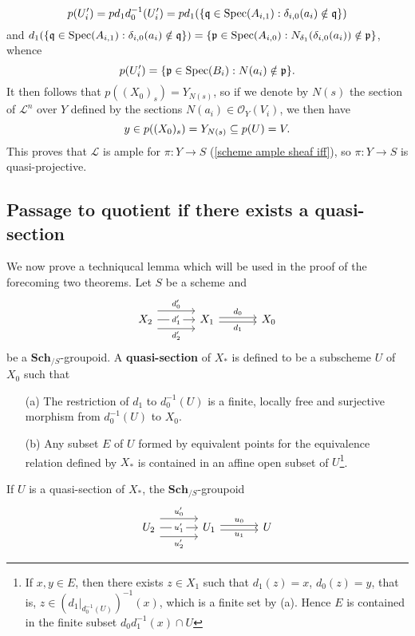 \begin{remark}
\[p(U'_i)=pd_1d_0^{-1}(U_i')=pd_1(\{\mathfrak{q}\in\mathrm{Spec}(A_{i,1}):\delta_{i,0}(a_i)\notin\mathfrak{q}\})\]
and $d_1(\{\mathfrak{q}\in\mathrm{Spec}(A_{i,1}):\delta_{i,0}(a_i)\notin\mathfrak{q}\})=\{\mathfrak{p}\in\mathrm{Spec}(A_{i,0}):N_{\delta_1}(\delta_{i,0}(a_i))\notin\mathfrak{p}\}$, whence
\[p(U_i')=\{\mathfrak{p}\in\mathrm{Spec}(B_i):N(a_i)\notin\mathfrak{p}\}.\]
It then follows that $p((X_0)_s)=Y_{N(s)}$, so if we denote by $N(s)$ the section of $\mathscr{L}^n$ over $Y$ defined by the sections $N(a_i)\in\mathscr{O}_Y(V_i)$, we then have
\begin{equation}
y\in p((X_0)_s)=Y_{N(s)}\subseteq p(U)=V.
\end{equation} 
This proves that $\mathscr{L}$ is ample for $\pi:Y\to S$ (\cref{scheme ample sheaf iff}), so $\pi:Y\to S$ is quasi-projective.
\end{remark}

\subsection{Passage to quotient if there exists a quasi-section}
We now prove a techniqucal lemma which will be used in the proof of the forecoming two theorems. Let $S$ be a scheme and
\[\begin{tikzcd}[column sep=12mm]
X_2\ar[r,shift left=8pt,"d_0'"]\ar[r,shift right=8pt,swap,"d_2'"]\ar[r,"d_1'"description]&X_1\ar[r,shift left=2pt,"d_0"]\ar[r,shift right=2pt,swap,"d_1"]&X_0
\end{tikzcd}\]
be a $\mathbf{Sch}_{/S}$-groupoid. A \textbf{quasi-section} of $X_*$ is defined to be a subscheme $U$ of $X_0$ such that
\begin{enumerate}
    \item[(a)] The restriction of $d_1$ to $d_0^{-1}(U)$ is a finite, locally free and surjective morphism from $d_0^{-1}(U)$ to $X_0$.
    \item[(b)] Any subset $E$ of $U$ formed by equivalent points for the equivalence relation defined by $X_*$ is contained in an affine open subset of $U$\footnote{If $x,y\in E$, then there exists $z\in X_1$ such that $d_1(z)=x$, $d_0(z)=y$, that is, $z\in (d_1|_{d_0^{-1}(U)})^{-1}(x)$, which is a finite set by (a). Hence $E$ is contained in the finite subset $d_0d_1^{-1}(x)\cap U$}.
\end{enumerate}
If $U$ is a quasi-section of $X_*$, the $\mathbf{Sch}_{/S}$-groupoid
\[\begin{tikzcd}[column sep=12mm]
U_2\ar[r,shift left=8pt,"u_0'"]\ar[r,shift right=8pt,swap,"u_2'"]\ar[r,"u_1'"description]&U_1\ar[r,shift left=2pt,"u_0"]\ar[r,shift right=2pt,swap,"u_1"]&U
\end{tikzcd}\]
